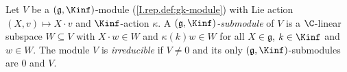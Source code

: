 Let $V$ be a $(\mathfrak g,\Kinf)$-module (\cref{I.rep.def:gk-module}) with Lie action $(X,v)\mapsto X\cdot v$ and
$\Kinf$-action $\kappa$. A \emph{$(\mathfrak g,\Kinf)$-submodule} of $V$ is a $\C$-linear subspace $W\subseteq V$ with
$X\cdot w\in W$ and $\kappa(k)w\in W$ for all $X\in\mathfrak g$, $k\in\Kinf$ and $w\in W$. The module $V$ is
\emph{irreducible} if $V\neq0$ and its only $(\mathfrak g,\Kinf)$-submodules are $0$ and $V$.
